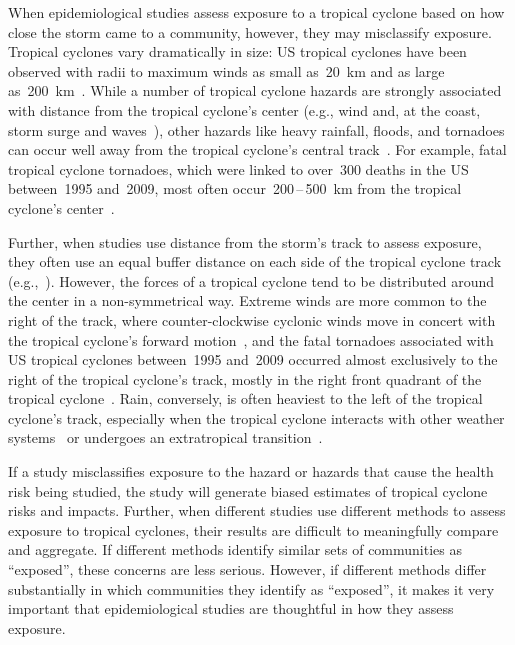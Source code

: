 When epidemiological studies assess exposure to a tropical cyclone based on 
how close the storm came to a community, however, they may misclassify exposure. 
Tropical cyclones vary dramatically in size: \ac{US} tropical
cyclones have been observed with radii to maximum winds as small
as~20~\si{\kilo\metre} and as large
as~200~\si{\kilo\metre}~\parencite{mallin2006, quiring2011variations}.  While a
number of tropical cyclone hazards are strongly associated with distance from
the tropical cyclone's center (e.g., wind and, at the coast, storm surge and
waves~\parencite{rappaport2000, kruk2010}), other hazards like heavy rainfall,
floods, and tornadoes can occur well away from the tropical cyclone's central
track~\parencite{rappaport2000, atallah2007, moore2012}.  For example, fatal
tropical cyclone tornadoes, which were linked to over~300 deaths in the \ac{US}
between~1995 and~2009, most often occur~200\,--\,500~\si{\kilo\metre} from the
tropical cyclone's center~\parencite{moore2012}.  

Further, when studies use distance from the storm's track to assess exposure,
they often use an equal buffer distance on each side of the tropical cyclone
track (e.g.,~\cite{czajkowski2011, grabich2015, grabich2016, zandbergen2009,
tansel2010}). However, the forces of a tropical cyclone tend to be distributed
around the center in a non-symmetrical way. Extreme winds are more common to
the right of the track, where counter-clockwise cyclonic winds move in concert
with the tropical cyclone's forward motion~\parencite{halverson2015}, and the
fatal tornadoes associated with \ac{US} tropical cyclones between~1995 and~2009
occurred almost exclusively to the right of the tropical cyclone's track,
mostly in the right front quadrant of the tropical
cyclone~\parencite{moore2012}. Rain, conversely, is often heaviest to the left
of the tropical cyclone's track, especially when the tropical cyclone interacts
with other weather systems~\parencite{atallah2003, atallah2007,
zhu2013variations} or undergoes an extratropical
transition~\parencite{elsberry2002}.

If a study misclassifies exposure to the hazard or hazards that cause the
health risk being studied, the study will generate biased estimates of tropical
cyclone risks and impacts. Further, when different studies use different
methods to assess exposure to tropical cyclones, their results are difficult to
meaningfully compare and aggregate. If different methods identify
similar sets of communities as ``exposed'',  these concerns are less serious.
However, if different methods differ substantially in which communities they
identify as ``exposed'', it makes it very important that epidemiological
studies are thoughtful in how they assess exposure.


